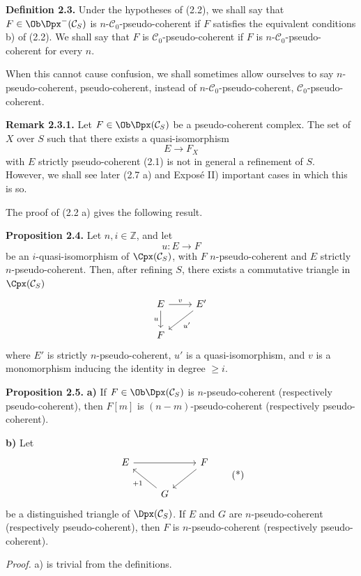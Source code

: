 \textbf{Definition 2.3.} Under the hypotheses of (2.2), we shall say that \(F\in\Ob\Dpx^-(\mathcal C_S)\) is \(n\)-\(\mathcal C_0\)-pseudo-coherent if \(F\) satisfies the equivalent conditions b) of (2.2). We shall say that \(F\) is \(\mathcal C_0\)-pseudo-coherent if \(F\) is \(n\)-\(\mathcal C_0\)-pseudo-coherent for every \(n\).

When this cannot cause confusion, we shall sometimes allow ourselves to say \(n\)-pseudo-coherent, pseudo-coherent, instead of \(n\)-\(\mathcal C_0\)-pseudo-coherent, \(\mathcal C_0\)-pseudo-coherent.

\textbf{Remark 2.3.1.} Let \(F\in\Ob\Dpx(\mathcal C_S)\) be a pseudo-coherent complex. The set of \(X\) over \(S\) such that there exists a quasi-isomorphism
\[
  E\longrightarrow F_X
\]
with \(E\) strictly pseudo-coherent (2.1) is not in general a refinement of \(S\). However, we shall see later (2.7 a) and Exposé II) important cases in which this is so.

The proof of (2.2 a) gives the following result.

\textbf{Proposition 2.4.} Let \(n,i\in\mathbb Z\), and let
\[
  u:E\longrightarrow F
\]
be an \(i\)-quasi-isomorphism of \(\Cpx(\mathcal C_S)\), with \(F\) \(n\)-pseudo-coherent and \(E\) strictly \(n\)-pseudo-coherent. Then, after refining \(S\), there exists a commutative triangle in \(\Cpx(\mathcal C_S)\)
\[
\begin{tikzcd}
E \arrow[r,"v"] \arrow[d,"u"'] & E' \arrow[dl,"u'"]\\
F &
\end{tikzcd}
\]
where \(E'\) is strictly \(n\)-pseudo-coherent, \(u'\) is a quasi-isomorphism, and \(v\) is a monomorphism inducing the identity in degree \(\geq i\).

\textbf{Proposition 2.5.} \textbf{a)} If \(F\in\Ob\Dpx(\mathcal C_S)\) is \(n\)-pseudo-coherent (respectively pseudo-coherent), then \(F[m]\) is \((n-m)\)-pseudo-coherent (respectively pseudo-coherent).

\textbf{b)} Let
\[
\begin{tikzcd}
E \arrow[rr] && F \arrow[dl]\\
& G \arrow[ul,"+1"] &
\end{tikzcd}
\tag{*}
\]
be a distinguished triangle of \(\Dpx(\mathcal C_S)\). If \(E\) and \(G\) are \(n\)-pseudo-coherent (respectively pseudo-coherent), then \(F\) is \(n\)-pseudo-coherent (respectively pseudo-coherent).

\emph{Proof.} a) is trivial from the definitions.

